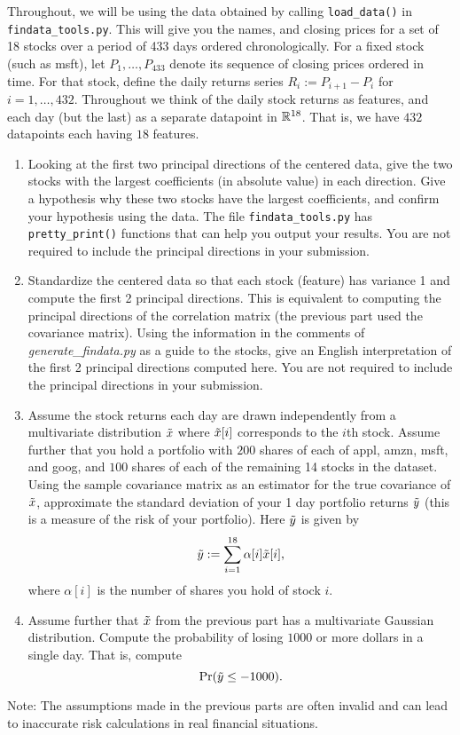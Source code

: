 \documentclass[12pt,twoside]{article}
\begin{document}
\begin{enumerate}
  Throughout, we will be using the data obtained by calling
 \verb|load_data()| in \verb|findata_tools.py|.  This will
  give you the names, and closing prices for a set of 18 stocks over a
  period of 433 days ordered chronologically.
  For a fixed stock (such as msft), let
  $P_1,\ldots,P_{433}$ denote its sequence of closing prices ordered in
  time.  For that stock, define the daily returns series $R_i:=P_{i+1}-P_i$ for
  $i=1,\ldots,432$.  Throughout we think of the daily stock returns as features,
  and each day (but the last) as a separate datapoint in $\mathbb{R}^{18}$.
  That is, we have $432$ datapoints each having $18$ features.
  \begin{enumerate}
  \item Looking at the first two principal directions of the
    centered data, give the two stocks with the largest
    coefficients (in absolute value) in each direction.  
    Give a hypothesis why these two stocks have the largest
    coefficients, and confirm your hypothesis using the data.  The file 
 \verb|findata_tools.py| has \verb|pretty_print()|
    functions that can help you output your results.
    You are not required to include the principal directions in
    your submission.
  \item Standardize the centered data so that each stock (feature) has
    variance 1 and compute the first 2 principal directions.  This is
    equivalent to computing the principal directions of the
    correlation matrix (the previous part used the covariance
    matrix).  Using the information in the comments of
   \emph{generate\_findata.py} as a guide to the stocks, 
    give an English interpretation of the first 2 principal directions
    computed here. 
    You are not required to include the principal directions in
    your submission.
  \item Assume the stock returns each day are drawn independently from a
    multivariate distribution $\tilde{  x }$ where
    $\tilde{  x }[i]$ corresponds to the $i$th stock.  Assume further that
    you hold a portfolio with $200$ shares of each of appl, amzn, msft, and
    goog, and $100$ shares of each of the remaining 14 stocks in the
    dataset.  Using the sample covariance matrix as an estimator for
    the true covariance of $\tilde{  x }$, approximate the standard deviation of
    your 1 day portfolio returns $\tilde{  y }$ (this is a measure of the risk of your
    portfolio).  Here $\tilde{  y }$ is given by
    $$\tilde{  y } := \sum_{i=1}^{18} \alpha[i] \tilde{  x }[i],$$
    where $\alpha[i]$ is the number of shares you hold of stock $i$.  
  \item Assume further that $\tilde{  x }$ from the previous part has a
    multivariate Gaussian distribution.  Compute the probability
    of losing $1000$ or more dollars in a single day.  That is,
    compute
    $$\Pr(\tilde{  y } \leq -1000).$$
  \end{enumerate}
  Note: The assumptions made in the previous parts are often
  invalid and can lead to inaccurate risk calculations in real
  financial situations.   



\end{enumerate}
\end{document}

